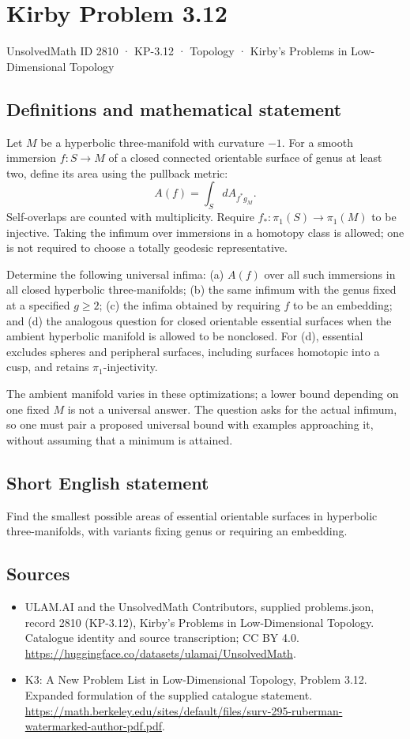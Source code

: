 \documentclass[11pt,a4paper]{article}
\begin{document}
\section*{Kirby Problem 3.12}\label{2810}
{\small UnsolvedMath ID 2810 · KP-3.12 · Topology · Kirby's Problems in Low-Dimensional Topology}
\subsection{Definitions and mathematical statement}
Let $M$ be a hyperbolic three-manifold with curvature $-1$. For a smooth
immersion $f:S\to M$ of a closed connected orientable surface of genus at
least two, define its area using the pullback metric:
\[
 A(f)=\int_S dA_{f^*g_M}.
\]
Self-overlaps are counted with multiplicity. Require $f_*:\pi_1(S)\to\pi_1(M)$
to be injective. Taking the infimum over immersions in a homotopy class is
allowed; one is not required to choose a totally geodesic representative.

Determine the following universal infima: (a) $A(f)$ over all such immersions
in all closed hyperbolic three-manifolds; (b) the same infimum with the genus
fixed at a specified $g\geq2$; (c) the infima obtained by requiring $f$ to be
an embedding; and (d) the analogous question for closed orientable essential
surfaces when the ambient hyperbolic manifold is allowed to be nonclosed.
For (d), essential excludes spheres and peripheral surfaces, including
surfaces homotopic into a cusp, and retains $\pi_1$-injectivity.

The ambient manifold varies in these optimizations; a lower bound depending
on one fixed $M$ is not a universal answer. The question asks for the actual
infimum, so one must pair a proposed universal bound with examples approaching
it, without assuming that a minimum is attained.
\subsection{Short English statement}
Find the smallest possible areas of essential orientable surfaces in hyperbolic three-manifolds, with variants fixing genus or requiring an embedding.
\subsection{Sources}
\begin{itemize}
\item[S1] ULAM.AI and the UnsolvedMath Contributors, supplied problems.json, record 2810 (KP-3.12), Kirby's Problems in Low-Dimensional Topology. Catalogue identity and source transcription; CC BY 4.0.
\url{https://huggingface.co/datasets/ulamai/UnsolvedMath}.
\item[S2] K3: A New Problem List in Low-Dimensional Topology, Problem 3.12. Expanded formulation of the supplied catalogue statement.
\url{https://math.berkeley.edu/sites/default/files/surv-295-ruberman-watermarked-author-pdf.pdf}.
\end{itemize}
\end{document}
